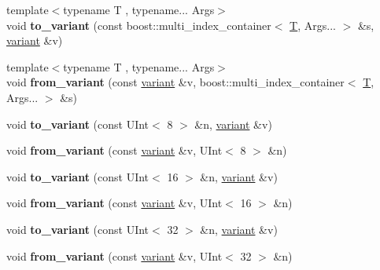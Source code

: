 \begin{DoxyCompactItemize}
\item 
\mbox{\label{namespacefc_aa2ee6da898b3aa59478687e9a27d7aef}} 
{\footnotesize template$<$typename T , typename... Args$>$ }\\void {\bfseries to\+\_\+variant} (const boost\+::multi\+\_\+index\+\_\+container$<$ \mbox{\hyperlink{struct_t}{T}}, Args... $>$ \&s, \mbox{\hyperlink{classfc_1_1variant}{variant}} \&v)
\item 
\mbox{\label{namespacefc_addba1c5d71fd8c01079776e2862f05f7}} 
{\footnotesize template$<$typename T , typename... Args$>$ }\\void {\bfseries from\+\_\+variant} (const \mbox{\hyperlink{classfc_1_1variant}{variant}} \&v, boost\+::multi\+\_\+index\+\_\+container$<$ \mbox{\hyperlink{struct_t}{T}}, Args... $>$ \&s)
\item 
\mbox{\label{namespacefc_ac3356755281c3b67b16d5ed87ed9617f}} 
void {\bfseries to\+\_\+variant} (const U\+Int$<$ 8 $>$ \&n, \mbox{\hyperlink{classfc_1_1variant}{variant}} \&v)
\item 
\mbox{\label{namespacefc_a205967d77ca48891a7c290ee0b7c81c3}} 
void {\bfseries from\+\_\+variant} (const \mbox{\hyperlink{classfc_1_1variant}{variant}} \&v, U\+Int$<$ 8 $>$ \&n)
\item 
\mbox{\label{namespacefc_a2cd592a8a4306988630cb05faf722b1d}} 
void {\bfseries to\+\_\+variant} (const U\+Int$<$ 16 $>$ \&n, \mbox{\hyperlink{classfc_1_1variant}{variant}} \&v)
\item 
\mbox{\label{namespacefc_a4171868028d897f88b440b7c1993716c}} 
void {\bfseries from\+\_\+variant} (const \mbox{\hyperlink{classfc_1_1variant}{variant}} \&v, U\+Int$<$ 16 $>$ \&n)
\item 
\mbox{\label{namespacefc_acc4fb44db5d0814b9c0e51e6d82005c2}} 
void {\bfseries to\+\_\+variant} (const U\+Int$<$ 32 $>$ \&n, \mbox{\hyperlink{classfc_1_1variant}{variant}} \&v)
\item 
\mbox{\label{namespacefc_ac6d6f50acff5290283a6f0460e40b694}} 
void {\bfseries from\+\_\+variant} (const \mbox{\hyperlink{classfc_1_1variant}{variant}} \&v, U\+Int$<$ 32 $>$ \&n)

\end{DoxyCompactItemize}
